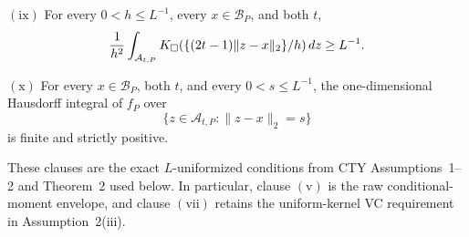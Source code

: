 \(\mathrm{(ix)}\) For every \(0<h\leq L^{-1}\), every \(x\in\mathcal B_P\), and both \(t\),
\[
 {1\over h^2}\int_{\mathcal A_{t,P}}
 K_\square(\{(2t-1)\lVert z-x\rVert_2\}/h)\,dz\geq L^{-1}.
\]

\(\mathrm{(x)}\) For every \(x\in\mathcal B_P\), both \(t\), and every \(0<s\leq L^{-1}\), the one-dimensional Hausdorff integral of \(f_P\) over
\[
 \{z\in\mathcal A_{t,P}:\lVert z-x\rVert_2=s\}
\]
is finite and strictly positive.

These clauses are the exact \(L\)-uniformized conditions from CTY Assumptions~1--2 and Theorem~2 used below.  In particular, clause \(\mathrm{(v)}\) is the raw conditional-moment envelope, and clause \(\mathrm{(vii)}\) retains the uniform-kernel VC requirement in Assumption~2(iii).